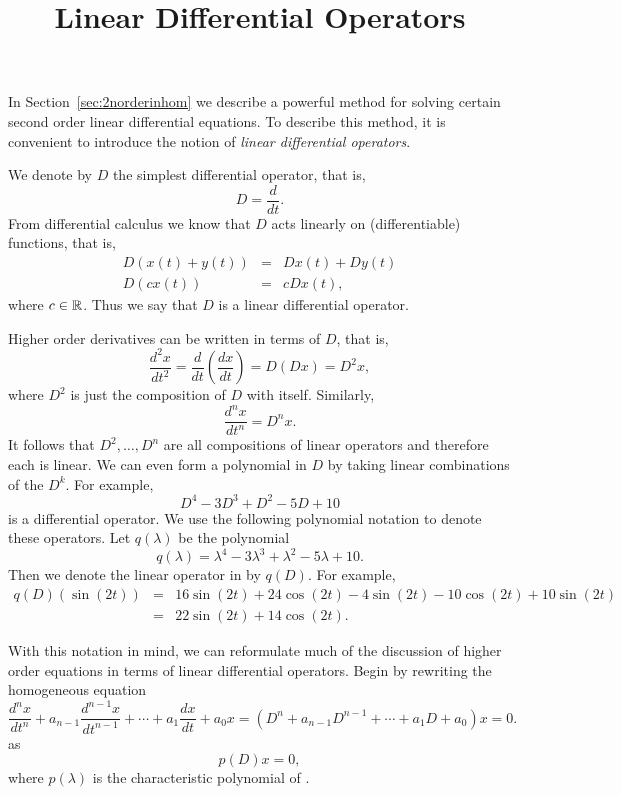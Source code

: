 \documentclass{ximera}
\title{Linear Differential Operators}
\begin{document}
\begin{abstract}
\end{abstract}
\maketitle

  
\label{S:LDO}

In Section~\ref{sec:2norderinhom} we describe a powerful method for 
solving certain second order linear differential equations.  To describe 
this method, it is convenient to introduce the notion of {\em linear 
differential operators}.

We denote by $D$ the simplest differential 
operator, that is,
\[
D=\frac{d}{dt}.
\]
From differential calculus we know that $D$ acts linearly on 
(differentiable) functions, that is,
\begin{eqnarray*}
D(x(t)+y(t)) & = & Dx(t) + Dy(t) \\
D(cx(t)) & = & cDx(t),
\end{eqnarray*}
where $c\in\mbox{$\Bbb{R}$}$.  Thus we say that $D$ is a linear differential operator.

Higher order derivatives can be written in terms of $D$, that is,
\[
\frac{d^2x}{dt^2} = \frac{d}{dt}\left(\frac{dx}{dt}\right) = D(Dx) = D^2x,
\]
where $D^2$ is just the composition of $D$ with itself.  Similarly, 
\[
\frac{d^nx}{dt^n} = D^nx.
\]
It follows that $D^2,\ldots,D^n$ are all compositions of linear operators
and therefore each is linear.  We can even form a polynomial in $D$ by taking
linear combinations of the $D^k$.  For example,
\begin{equation}  \label{E:pdo}
D^4 - 3D^3 + D^2 -5D + 10 
\end{equation}
is a differential operator.  
We use the following polynomial notation to 
denote these operators.  Let $q(\lambda)$ be the polynomial
\[
q(\lambda) = \lambda^4 -3\lambda^3 + \lambda^2 - 5\lambda +10.
\]
Then we denote the linear operator in  by $q(D)$.  For example,
\begin{eqnarray*}
q(D)(\sin(2t)) & = & 16\sin(2t) + 24\cos(2t) - 4\sin(2t) - 10\cos(2t) + 
10\sin(2t) \\ & = & 22\sin(2t) + 14\cos(2t).
\end{eqnarray*}


With this notation in mind, we can reformulate much of the discussion of 
higher order equations in terms of linear differential operators.  Begin by 
rewriting the homogeneous equation  
\[
\frac{d^nx}{dt^n}+a_{n-1}\frac{d^{n-1}x}{dt^{n-1}}+\cdots+
a_1\frac{dx}{dt}+a_0x = (D^n+a_{n-1}D^{n-1}+\cdots+a_1D+a_0)x = 0.
\]
as
\begin{equation}  \label{E:opern2}
p(D)x = 0,
\end{equation}
where $p(\lambda)$ is the characteristic 
polynomial 
of .
\end{document}
